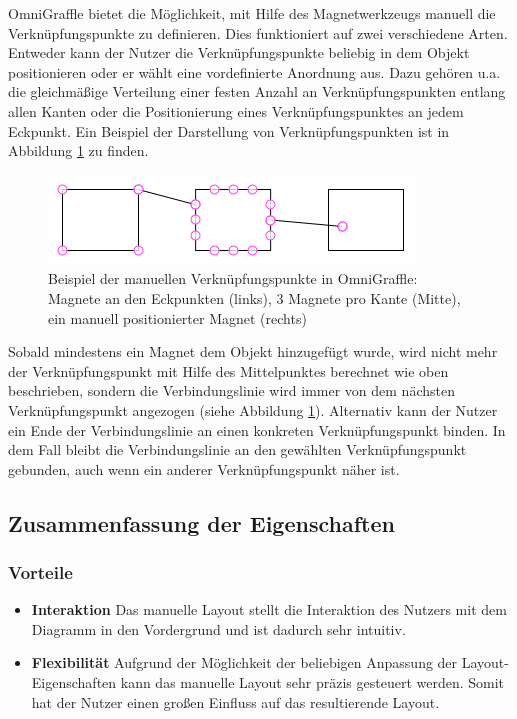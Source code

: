 OmniGraffle bietet die Möglichkeit, mit Hilfe des Magnetwerkzeugs manuell die Verknüpfungspunkte zu definieren. Dies funktioniert auf zwei verschiedene Arten. Entweder kann der Nutzer die Verknüpfungspunkte beliebig in dem Objekt positionieren oder er wählt eine vordefinierte Anordnung aus. Dazu gehören u.a. die gleichmäßige Verteilung einer festen Anzahl an Verknüpfungspunkten entlang allen Kanten oder die Positionierung eines Verknüpfungspunktes an jedem Eckpunkt. Ein Beispiel der Darstellung von Verknüpfungspunkten ist in Abbildung \ref{fig:omnigraffle-magnets-example} zu finden.

\begin{figure}[hbt]
    \centering
    \includegraphics{resources/omnigraffle-magnets-example.png}
    \caption{Beispiel der manuellen Verknüpfungspunkte in OmniGraffle: Magnete an den Eckpunkten (links), 3 Magnete pro Kante (Mitte), ein manuell positionierter Magnet (rechts)}
    \label{fig:omnigraffle-magnets-example}
\end{figure}

Sobald mindestens ein Magnet dem Objekt hinzugefügt wurde, wird nicht mehr der Verknüpfungspunkt mit Hilfe des Mittelpunktes berechnet wie oben beschrieben, sondern die Verbindungslinie wird immer von dem nächsten Verknüpfungspunkt angezogen (siehe Abbildung \ref{fig:omnigraffle-magnets-example}). Alternativ kann der Nutzer ein Ende der Verbindungslinie an einen konkreten Verknüpfungspunkt binden. In dem Fall bleibt die Verbindungslinie an den gewählten Verknüpfungspunkt gebunden, auch wenn ein anderer Verknüpfungspunkt näher ist.

\subsection{Zusammenfassung der Eigenschaften}

\subsubsection{Vorteile}

\begin{itemize}
    \item \textbf{Interaktion} Das manuelle Layout stellt die Interaktion des Nutzers mit dem Diagramm in den Vordergrund und ist dadurch sehr intuitiv.
    \item \textbf{Flexibilität} Aufgrund der Möglichkeit der beliebigen Anpassung der Layout-Eigenschaften kann das manuelle Layout sehr präzis gesteuert werden. Somit hat der Nutzer einen großen Einfluss auf das resultierende Layout.
\end{itemize}

